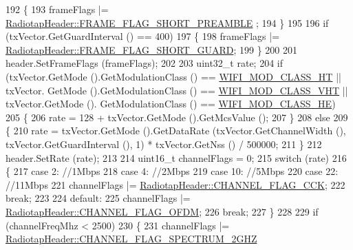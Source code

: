 \begin{DoxyCode}
192           \{
193             frameFlags |= \hyperlink{classns3_1_1RadiotapHeader_a4375e57b5815a2ac2d6cfe4ca0c703d4a654ebb50af85aaaee342f7939782efd1}{RadiotapHeader::FRAME\_FLAG\_SHORT\_PREAMBLE}
      ;
194           \}
195 
196         \textcolor{keywordflow}{if} (txVector.GetGuardInterval () == 400)
197           \{
198             frameFlags |= \hyperlink{classns3_1_1RadiotapHeader_a4375e57b5815a2ac2d6cfe4ca0c703d4a6656cb9084d29627022e94f04a1f0e0c}{RadiotapHeader::FRAME\_FLAG\_SHORT\_GUARD};
199           \}
200 
201         header.SetFrameFlags (frameFlags);
202 
203         uint32\_t rate;
204         \textcolor{keywordflow}{if} (txVector.GetMode ().GetModulationClass () == \hyperlink{namespacens3_aa999e1221606a2b21b1eb33c2007c217a6ac45cac36cc4454649435d24ebf349c}{WIFI\_MOD\_CLASS\_HT} || txVector.
      GetMode ().GetModulationClass () == \hyperlink{namespacens3_aa999e1221606a2b21b1eb33c2007c217a9863e4342bf5c238c74dddfc4d96c67e}{WIFI\_MOD\_CLASS\_VHT} || txVector.GetMode ().
      GetModulationClass () == \hyperlink{namespacens3_aa999e1221606a2b21b1eb33c2007c217abfa4f7272510045a9b43e8ac27ac13b0}{WIFI\_MOD\_CLASS\_HE})
205           \{
206             rate = 128 + txVector.GetMode ().GetMcsValue ();
207           \}
208         \textcolor{keywordflow}{else}
209           \{
210             rate = txVector.GetMode ().GetDataRate (txVector.GetChannelWidth (), txVector.GetGuardInterval 
      (), 1) * txVector.GetNss () / 500000;
211           \}
212         header.SetRate (rate);
213 
214         uint16\_t channelFlags = 0;
215         \textcolor{keywordflow}{switch} (rate)
216           \{
217           \textcolor{keywordflow}{case} 2:  \textcolor{comment}{//1Mbps}
218           \textcolor{keywordflow}{case} 4:  \textcolor{comment}{//2Mbps}
219           \textcolor{keywordflow}{case} 10: \textcolor{comment}{//5Mbps}
220           \textcolor{keywordflow}{case} 22: \textcolor{comment}{//11Mbps}
221             channelFlags |= \hyperlink{classns3_1_1RadiotapHeader_a26df5fbb86499c692bd97a99781c8140a740fb537c6a0c4c743e3d597d99b7714}{RadiotapHeader::CHANNEL\_FLAG\_CCK};
222             \textcolor{keywordflow}{break};
223 
224           \textcolor{keywordflow}{default}:
225             channelFlags |= \hyperlink{classns3_1_1RadiotapHeader_a26df5fbb86499c692bd97a99781c8140a618a5705ee75fd8eea124cd36a6bfbba}{RadiotapHeader::CHANNEL\_FLAG\_OFDM};
226             \textcolor{keywordflow}{break};
227           \}
228 
229         \textcolor{keywordflow}{if} (channelFreqMhz < 2500)
230           \{
231             channelFlags |= \hyperlink{classns3_1_1RadiotapHeader_a26df5fbb86499c692bd97a99781c8140ad68676f7619fa54f09340cd1f4f72ce6}{RadiotapHeader::CHANNEL\_FLAG\_SPECTRUM\_2GHZ}

\end{DoxyCode}
